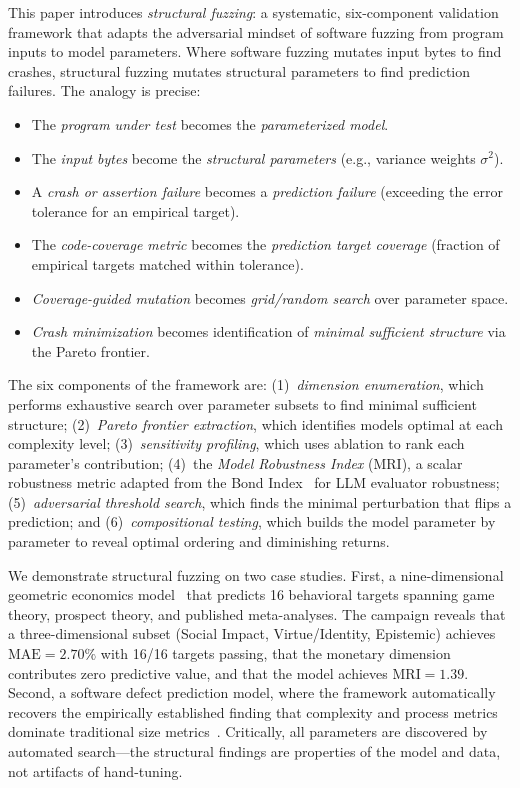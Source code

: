 \documentclass[manuscript,review,anonymous]{acmart}
\newcommand{\MAE}{\mathrm{MAE}}
\newcommand{\MRI}{\mathrm{MRI}}
\begin{document}
This paper introduces \emph{structural fuzzing}: a systematic, six-component validation framework that adapts the adversarial mindset of software fuzzing from program inputs to model parameters.
Where software fuzzing mutates input bytes to find crashes, structural fuzzing mutates structural parameters to find prediction failures.
The analogy is precise:

\begin{itemize}
    \item The \emph{program under test} becomes the \emph{parameterized model}.
    \item The \emph{input bytes} become the \emph{structural parameters} (e.g., variance weights $\sigma^2$).
    \item A \emph{crash or assertion failure} becomes a \emph{prediction failure} (exceeding the error tolerance for an empirical target).
    \item The \emph{code-coverage metric} becomes the \emph{prediction target coverage} (fraction of empirical targets matched within tolerance).
    \item \emph{Coverage-guided mutation} becomes \emph{grid/random search} over parameter space.
    \item \emph{Crash minimization} becomes identification of \emph{minimal sufficient structure} via the Pareto frontier.
\end{itemize}

The six components of the framework are: (1)~\emph{dimension enumeration}, which performs exhaustive search over parameter subsets to find minimal sufficient structure; (2)~\emph{Pareto frontier extraction}, which identifies models optimal at each complexity level; (3)~\emph{sensitivity profiling}, which uses ablation to rank each parameter's contribution; (4)~the \emph{Model Robustness Index} (MRI), a scalar robustness metric adapted from the Bond Index~\cite{bond2026} for LLM evaluator robustness; (5)~\emph{adversarial threshold search}, which finds the minimal perturbation that flips a prediction; and (6)~\emph{compositional testing}, which builds the model parameter by parameter to reveal optimal ordering and diminishing returns.

We demonstrate structural fuzzing on two case studies.
First, a nine-dimensional geometric economics model~\cite{bond2026b} that predicts 16 behavioral targets spanning game theory, prospect theory, and published meta-analyses.
The campaign reveals that a three-dimensional subset (Social Impact, Virtue/Identity, Epistemic) achieves $\MAE = 2.70\%$ with 16/16 targets passing, that the monetary dimension contributes zero predictive value, and that the model achieves $\MRI = 1.39$.
Second, a software defect prediction model, where the framework automatically recovers the empirically established finding that complexity and process metrics dominate traditional size metrics~\cite{menzies2007,hall2012}.
Critically, all parameters are discovered by automated search---the structural findings are properties of the model and data, not artifacts of hand-tuning.
\end{document}
